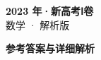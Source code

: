 \documentclass[zihao=-4, a4paper]{ctexart}
\begin{document}
\begin{center}
  {\Large\bfseries 2023 年·新高考Ⅰ卷}\\[4pt]
  {\large 数学 · 解析版}
\end{center}
\medskip
{}

\clearpage
{}
\begin{center}{\Large\bfseries 参考答案与详细解析}\end{center}
\medskip

\end{document}

